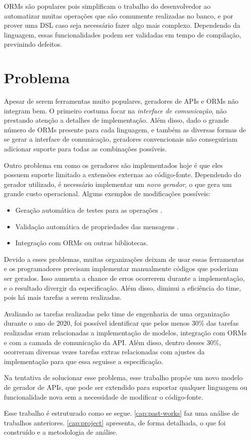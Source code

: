 ORMs são populares pois simplificam o trabalho do desenvolvedor ao automatizar muitas
operações que são comumente realizadas no banco, e por prover uma DSL caso seja
necessário fazer algo mais complexo. Dependendo da linguagem, essas funcionalidades
podem ser validadas em tempo de compilação, previnindo defeitos.

\section{Problema}

Apesar de serem ferramentas muito populares, geradores de APIs e ORMs não integram
bem. O primeiro costuma focar na \textit{interface de comunicação}, não prestando
atenção a detalhes de implementação. Além disso, dado o grande número de ORMs
presente para cada linguagem, e também as diversas formas de se gerar a interface
de comunicação, geradores convencionais não conseguiriam adicionar suporte para
todas as combinações possíveis.

Outro problema em como os geradores são implementados hoje é que eles possuem
suporte limitado a extensões externas ao código-fonte. Dependendo do gerador
utilizado, é necessário implementar um \textit{novo gerador}, o que gera um grande
custo operacional. Alguns exemplos de modificações possíveis:

\begin{itemize}
\item
  Geração automática de testes para as operações \cite{9159071}.
\item
  Validação automática de propriedades das mensagens \cite{envoy:protoc-gen-validate}.
\item
  Integração com ORMs ou outras bibliotecas.
\end{itemize}

Devido a esses problemas, muitas organizações deixam de usar essas ferramentas e os
programadores precisam implementar manualmente códigos que poderiam ser gerados.
Isso aumenta a chance de erros ocorrerem durante a implementação, e o resultado divergir
da especificação. Além disso, diminui a eficiência do time, pois há mais tarefas a
serem realizadas.

Avaliando as tarefas realizadas pelo time de engenharia de uma organização durante o
ano de 2020, foi possível identificar que pelos menos 30\% das tarefas realizadas
eram relacionadas a implementação de modelos, integração com ORMs e com a camada
de comunicação da API. Além disso, dentro desses 30\%, ocorreram diversas vezes tarefas
extras relacionadas com ajustes da implementação para que essa seguisse a especificação.

Na tentativa de solucionar esse problema, esse trabalho propõe um novo modelo de
gerador de APIs, que pode ser extendido para suportar qualquer linguagem ou funcionalidade
nova sem a necessidade de modificar o código-fonte.

Esse trabalho é estruturado como se segue. \cref{cap:past-works} faz uma análise
de trabalhos anteriores. \cref{cap:project} apresenta, de forma detalhada, o que
foi construído e a metodologia de análise.
